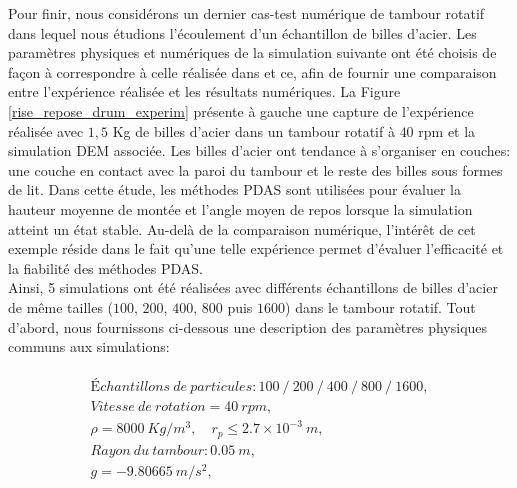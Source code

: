 Pour finir, nous considérons un dernier cas-test numérique de tambour rotatif dans lequel nous étudions l'écoulement d'un échantillon de billes d'acier. Les paramètres physiques et numériques de la simulation suivante ont été choisis de façon à correspondre à celle réalisée dans \cite{maione2015investigation} et ce, afin de fournir une comparaison entre l'expérience réalisée et les résultats numériques. La Figure \ref{rise_repose_drum_experim} présente à gauche une capture de l'expérience réalisée avec $1,5 $ Kg de billes d'acier dans un tambour rotatif à $40 $ rpm et la simulation DEM associée. Les billes d'acier ont tendance à s'organiser en couches: une couche en contact avec la paroi du tambour et le reste des billes sous formes de lit. Dans cette étude, les méthodes PDAS sont utilisées pour évaluer la hauteur moyenne de montée et l'angle moyen de repos lorsque la simulation atteint un état stable. Au-delà de la comparaison numérique, l'intérêt de cet exemple réside dans le fait qu'une telle expérience permet d'évaluer l'efficacité et la fiabilité des méthodes PDAS. \\

Ainsi, 5 simulations ont été réalisées avec différents échantillons de billes d'acier de même tailles ($ 100 $, $200 $, $400 $, $800 $ puis $1600 $) dans le tambour rotatif. Tout d'abord, nous fournissons ci-dessous une description des paramètres physiques communs aux simulations:

\begin{eqnarray*}
	\begin{array}{l}
	    Échantillons \ de\ particules: 100\ /\ 200\ /\ 400\ /\ 800\ /\ 1600,\nonumber\\[2mm]
	    Vitesse\ de\ rotation = 40\ rpm,\nonumber\\[2mm]
	    \rho=8000\ Kg/m^3, \quad r_p \leq 2.7\times10^{-3}\ m,\nonumber\\[2mm]
		Rayon\ du\ tambour: 0.05\ m,\nonumber\\[2mm] 
		g = -9.80665\ m/s^2,\nonumber\\[2mm]
	\end{array}
\end{eqnarray*}

